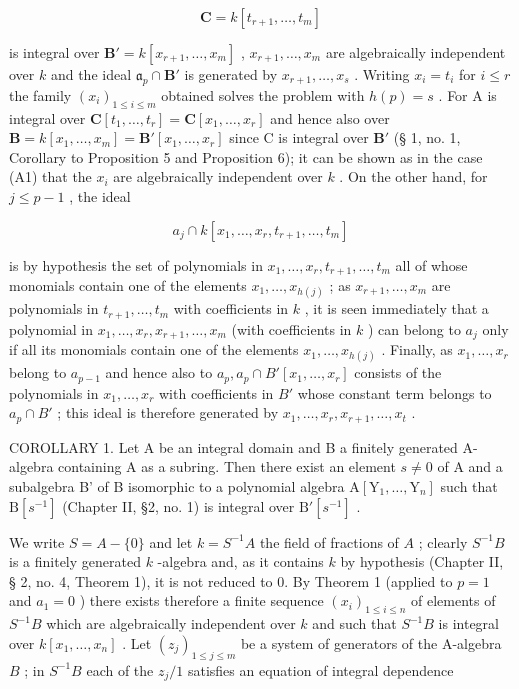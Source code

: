 \[
\mathbf {C} = k [ t _ {r + 1}, \dots , t _ {m} ]
\]

is integral over \(\mathbf{B}' = k[x_{r+1},\ldots,x_m]\) , \(x_{r+1},\ldots,x_m\) are algebraically independent over \(k\) and the ideal \(\mathfrak{a}_p\cap\mathbf{B}'\) is generated by \(x_{r+1},\ldots,x_s\) . Writing \(x_i=t_i\) for \(i\leqslant r\) the family \((x_i)_{1\leqslant i\leqslant m}\) obtained solves the problem with \(h(p)=s\) . For A is integral over \(\mathbf{C}[t_1,\ldots,t_r]=\mathbf{C}[x_1,\ldots,x_r]\) and hence also over \(\mathbf{B}=k[x_1,\ldots,x_m]=\mathbf{B}'[x_1,\ldots,x_r]\) since C is integral over \(\mathbf{B}'\) (§ 1, no. 1, Corollary to Proposition 5 and Proposition 6); it can be shown as in the case (A1) that the \(x_i\) are algebraically independent over \(k\) . On the other hand, for \(j\leqslant p-1\) , the ideal

\[
a _ {j} \cap k [ x _ {1}, \dots , x _ {r}, t _ {r + 1}, \dots , t _ {m} ]
\]

is by hypothesis the set of polynomials in \(x_1, \ldots, x_r, t_{r+1}, \ldots, t_m\) all of whose monomials contain one of the elements \(x_1, \ldots, x_{h(j)}\) ; as \(x_{r+1}, \ldots, x_m\) are polynomials in \(t_{r+1}, \ldots, t_m\) with coefficients in \(k\) , it is seen immediately that a polynomial in \(x_1, \ldots, x_r, x_{r+1}, \ldots, x_m\) (with coefficients in \(k\) ) can belong to \(a_j\) only if all its monomials contain one of the elements \(x_1, \ldots, x_{h(j)}\) . Finally, as \(x_1, \ldots, x_r\) belong to \(a_{p-1}\) and hence also to \(a_p, a_p \cap B'[x_1, \ldots, x_r]\) consists of the polynomials in \(x_1, \ldots, x_r\) with coefficients in \(B'\) whose constant term belongs to \(a_p \cap B'\) ; this ideal is therefore generated by \(x_1, \ldots, x_r, x_{r+1}, \ldots, x_t\) .

COROLLARY 1. Let A be an integral domain and B a finitely generated A-algebra containing A as a subring. Then there exist an element \(s \neq 0\) of A and a subalgebra B' of B isomorphic to a polynomial algebra \(\mathrm{A}[\mathrm{Y}_{1}, \ldots, \mathrm{Y}_{n}]\) such that \(\mathrm{B}[s^{-1}]\) (Chapter II, §2, no. 1) is integral over \(\mathrm{B}'[s^{-1}]\) .

We write \(S = A - \{0\}\) and let \(k = S^{-1}A\) the field of fractions of \(A\) ; clearly \(S^{-1}B\) is a finitely generated \(k\) -algebra and, as it contains \(k\) by hypothesis (Chapter II, § 2, no. 4, Theorem 1), it is not reduced to 0. By Theorem 1 (applied to \(p = 1\) and \(a_1 = 0\) ) there exists therefore a finite sequence \((x_i)_{1 \leqslant i \leqslant n}\) of elements of \(S^{-1}B\) which are algebraically independent over \(k\) and such that \(S^{-1}B\) is integral over \(k[x_1, \ldots, x_n]\) . Let \((z_j)_{1 \leqslant j \leqslant m}\) be a system of generators of the A-algebra \(B\) ; in \(S^{-1}B\) each of the \(z_j/1\) satisfies an equation of integral dependence

